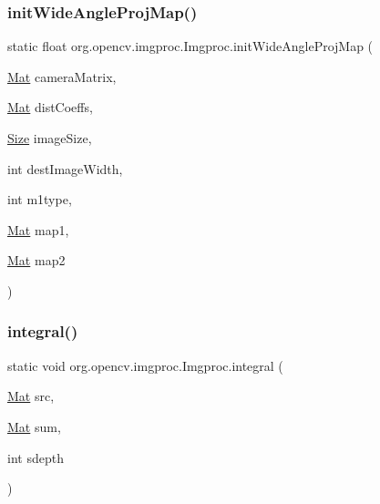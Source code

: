 \subsubsection{\texorpdfstring{init\+Wide\+Angle\+Proj\+Map()}{initWideAngleProjMap()}\hspace{0.1cm}{\footnotesize\ttfamily [2/2]}}
{\footnotesize\ttfamily static float org.\+opencv.\+imgproc.\+Imgproc.\+init\+Wide\+Angle\+Proj\+Map (\begin{DoxyParamCaption}\item[{\mbox{\hyperlink{classorg_1_1opencv_1_1core_1_1_mat}{Mat}}}]{camera\+Matrix,  }\item[{\mbox{\hyperlink{classorg_1_1opencv_1_1core_1_1_mat}{Mat}}}]{dist\+Coeffs,  }\item[{\mbox{\hyperlink{classorg_1_1opencv_1_1core_1_1_size}{Size}}}]{image\+Size,  }\item[{int}]{dest\+Image\+Width,  }\item[{int}]{m1type,  }\item[{\mbox{\hyperlink{classorg_1_1opencv_1_1core_1_1_mat}{Mat}}}]{map1,  }\item[{\mbox{\hyperlink{classorg_1_1opencv_1_1core_1_1_mat}{Mat}}}]{map2 }\end{DoxyParamCaption})\hspace{0.3cm}{\ttfamily [static]}}

\mbox{\label{classorg_1_1opencv_1_1imgproc_1_1_imgproc_a44841cd68ca7d5aeba8b98f886a3f8c9}} 
\subsubsection{\texorpdfstring{integral()}{integral()}\hspace{0.1cm}{\footnotesize\ttfamily [1/2]}}
{\footnotesize\ttfamily static void org.\+opencv.\+imgproc.\+Imgproc.\+integral (\begin{DoxyParamCaption}\item[{\mbox{\hyperlink{classorg_1_1opencv_1_1core_1_1_mat}{Mat}}}]{src,  }\item[{\mbox{\hyperlink{classorg_1_1opencv_1_1core_1_1_mat}{Mat}}}]{sum,  }\item[{int}]{sdepth }\end{DoxyParamCaption})\hspace{0.3cm}{\ttfamily [static]}}

